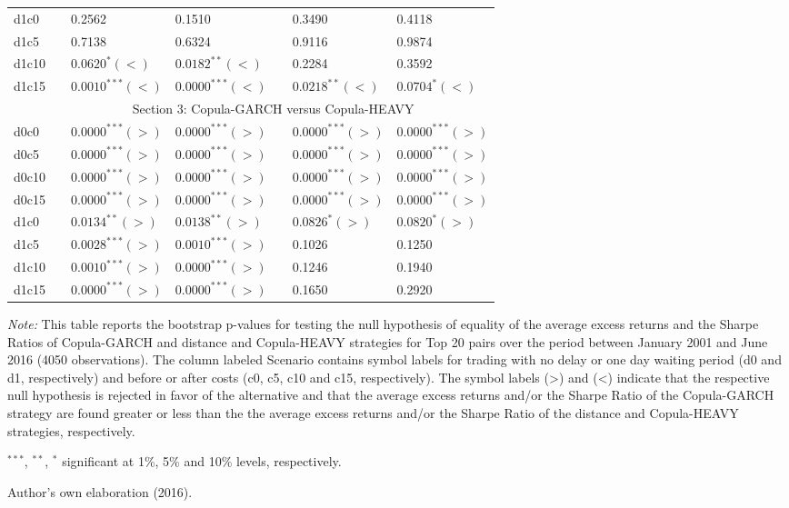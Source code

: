 \documentclass[a4paper,12pt]{report}
\begin{document}
\begin{threeparttable}[H]
\begin{tabularx}{\textwidth}{@{\extracolsep{\fill}}lllllll@{}}
		d1c0 & & 0.2562 & 0.1510  &       & 0.3490 & 0.4118 \\
		d1c5 & & 0.7138 & 0.6324 &       & 0.9116 & 0.9874 \\
		d1c10 & & $0.0620^{*}(<)$ & $0.0182^{**}(<)$ &       & 0.2284 & 0.3592 \\
		d1c15 & & $0.0010^{***}(<)$ & $0.0000^{***}(<)$ &       & $0.0218^{**}(<)$ & $0.0704^{*}(<)$ \\
		\midrule
		& \multicolumn{6}{c}{Section 3: Copula-GARCH versus Copula-HEAVY} \\
		\midrule
		d0c0 & & $0.0000^{***}(>)$ & $0.0000^{***}(>)$ &       & $0.0000^{***}(>)$ & $0.0000^{***}(>)$ \\
		d0c5 & & $0.0000^{***}(>)$ & $0.0000^{***}(>)$ &       & $0.0000^{***}(>)$ & $0.0000^{***}(>)$   \\
		d0c10 & & $0.0000^{***}(>)$ & $0.0000^{***}(>)$ &       & $0.0000^{***}(>)$ & $0.0000^{***}(>)$ \\
		d0c15 & & $0.0000^{***}(>)$ & $0.0000^{***}(>)$ &       & $0.0000^{***}(>)$ & $0.0000^{***}(>)$ \\
		d1c0 & & $0.0134^{**}(>)$  & $0.0138^{**}(>)$  &       & $0.0826^{*}(>)$  & $0.0820^{*}(>)$ \\
		d1c5 & & $0.0028^{***}(>)$ & $0.0010^{***}(>)$ &       & 0.1026 & 0.1250 \\
		d1c10 & & $0.0010^{***}(>)$ & $0.0000^{***}(>)$ &       & 0.1246 & 0.1940 \\
		d1c15 & & $0.0000^{***}(>)$ & $0.0000^{***}(>)$ &       & 0.1650 & 0.2920 \\
		\bottomrule
	\end{tabularx}%
	\begin{tablenotes}
		\item \textit{Note:} \scriptsize This table reports the bootstrap p-values for testing the null hypothesis of equality of the average excess returns and the Sharpe Ratios of Copula-GARCH and distance and Copula-HEAVY strategies for Top 20 pairs over the period between January 2001 and June 2016 (4050 observations). The column labeled Scenario contains symbol labels for trading with no delay or one day waiting period (d0 and d1, respectively) and before or after costs (c0, c5, c10 and c15, respectively). The symbol labels (>) and (<) indicate that the respective null hypothesis is rejected in favor of the alternative and that the average excess returns and/or the Sharpe Ratio of the Copula-GARCH strategy are found greater or less than the the average excess returns and/or the Sharpe Ratio of the distance and Copula-HEAVY strategies, respectively.
		\item \scriptsize $^{\ast\ast\ast}$, $^{\ast\ast}$, $^{\ast}$ significant at 1\%, 5\% and 10\% levels, respectively.
		\item Author's own elaboration (2016).
	\end{tablenotes}
	\label{tab:table204}%
\end{threeparttable}%
\end{document}
